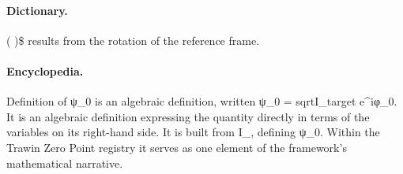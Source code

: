 \paragraph{Dictionary.}
( )\$ results from the rotation of the reference frame.

\paragraph{Encyclopedia.}
Definition of ψ\_0 is an algebraic definition, written ψ\_0 = sqrtI\_target e\textasciicircum{}iφ\_0. It is an algebraic definition expressing the quantity directly in terms of the variables on its right-hand side. It is built from I\_, defining ψ\_0. Within the Trawin Zero Point registry it serves as one element of the framework's mathematical narrative.
